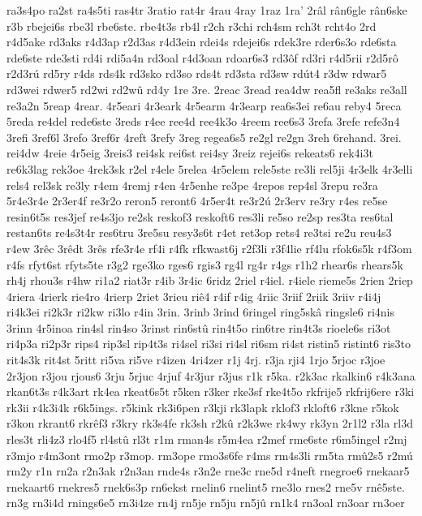 {ra3s4po
ra2st
ra4s5ti
ras4tr
3ratio
rat4r
4rau
4ray
1raz
1ra'
2râl
rân6gle
rân6ske
r3b
rbejei6s
rbe3l
rbe6ste.
rbe4t3s
rb4l
r2ch
r3chi
rch4sm
rch3t
rcht4o
2rd
r4d5ake
rd3aks
r4d3ap
r2d3as
r4d3ein
rdei4s
rdejei6s
rdek3re
rder6s3o
rde6sta
rde6ste
rde3sti
rd4i
rdi5a4n
rd3oal
r4d3oan
rdoar6s3
rd3ôf
rd3ri
r4d5rii
r2d5rô
r2d3rú
rd5ry
r4ds
rds4k
rd3sko
rd3so
rds4t
rd3sta
rd3sw
rdút4
r3dw
rdwar5
rd3wei
rdwer5
rd2wi
rd2wû
rd4y
1re
3re.
2reac
3read
rea4dw
rea5fl
re3aks
re3all
re3a2n
5reap
4rear.
4r5eari
4r3eark
4r5earm
4r3earp
rea6s3ei
re6au
reby4
5reca
5reda
re4del
rede6ste
3reds
r4ee
ree4d
ree4k3o
4reem
ree6s3
3refa
3refe
refe3n4
3refi
3ref6l
3refo
3ref6r
4reft
3refy
3reg
regea6s5
re2gl
re2gn
3reh
6rehand.
3rei.
rei4dw
4reie
4r5eig
3reis3
rei4sk
rei6st
rei4sy
3reiz
rejei6s
rekeats6
rek4i3t
re6k3lag
rek3oe
4rek3sk
r2el
r4ele
5relea
4r5elem
rele5ste
re3li
rel5ji
4r3elk
4r3elli
rels4
rel3sk
re3ly
r4em
4remj
r4en
4r5enhe
re3pe
4repos
rep4sl
3repu
re3ra
5r4e3r4e
2r3er4f
re3r2o
reron5
reront6
4r5er4t
re3r2ú
2r3erv
re3ry
r4es
re5se
resin6t5s
res3jef
re4s3jo
re2sk
reskof3
reskoft6
res3li
re5so
re2sp
res3ta
res6tal
restan6ts
re4s3t4r
res6tru
3re5su
resy3s6t
r4et
ret3op
rets4
re3tsi
re2u
reu4s3
r4ew
3rêc
3rêdt
3rês
rfe3r4e
rf4i
r4fk
rfkwast6j
r2f3li
r3f4lie
rf4lu
rfok6s5k
r4f3om
r4fs
rfyt6st
rfyts5te
r3g2
rge3ko
rges6
rgis3
rg4l
rg4r
r4gs
r1h2
rhear6s
rhears5k
rh4j
rhou3s
r4hw
ri1a2
riat3r
r4ib
3r4ic
6ridz
2riel
r4iel.
r4iele
rieme5s
2rien
2riep
4riera
4rierk
rie4ro
4rierp
2riet
3rieu
riê4
r4if
r4ig
4riic
3riif
2riik
3riiv
r4i4j
ri4k3ei
ri2k3r
ri2kw
ri3lo
r4in
3rin.
3rinb
3rind
6ringel
ring5skâ
ringsle6
ri4nis
3rinn
4r5inoa
rin4sl
rin4so
3rinst
rin6stû
rin4t5o
rin6tre
rin4t3s
rioele6s
ri3ot
ri4p3a
ri2p3r
rips4
rip3sl
rip4t3s
ri4sel
ri3si
ri4sl
ri6sm
ri4st
ristin5
ristint6
ris3to
rit4s3k
rit4st
5ritt
ri5va
ri5ve
r4izen
4ri4zer
r1j
4rj.
r3ja
rji4
1rjo
5rjoc
r3joe
2r3jon
r3jou
rjous6
3rju
5rjuc
4rjuf
4r3jur
r3jus
r1k
r5ka.
r2k3ac
rkalkin6
r4k3ana
rkan6t3s
r4k3art
rk4ea
rkeat6s5t
r5ken
r3ker
rke3sf
rke4t5o
rkfrije5
rkfrij6ere
r3ki
rk3ii
r4k3i4k
r6k5ings.
r5kink
rk3i6pen
r3kji
rk3lapk
rklof3
rkloft6
r3kne
r5kok
r3kon
rkrant6
rkrêf3
r3kry
rk3s4fe
rk3sh
r2kû
r2k3we
rk4wy
rk3yn
2r1l2
r3la
rl3d
rles3t
rli4z3
rlo4f5
rl4stû
rl3t
r1m
rman4s
r5m4ea
r2mef
rme6ste
r6m5ingel
r2mj
r3mjo
r4m3ont
rmo2p
r3mop.
rm3ope
rmo3s6fe
r4ms
rm4s3li
rm5ta
rmû2s5
r2mú
rm2y
r1n
rn2a
r2n3ak
r2n3an
rnde4s
r3n2e
rne3c
rne5d
r4neft
rnegroe6
rnekaar5
rnekaart6
rnekres5
rnek6s3p
rn6ekst
rnelin6
rnelint5
rne3lo
rnes2
rne5v
rnê5ste.
rn3g
rn3i4d
rnings6e5
rn3i4ze
rn4j
rn5je
rn5ju
rn5jû
rn1k4
rn3oal
rn3oar
rn3oer
}
